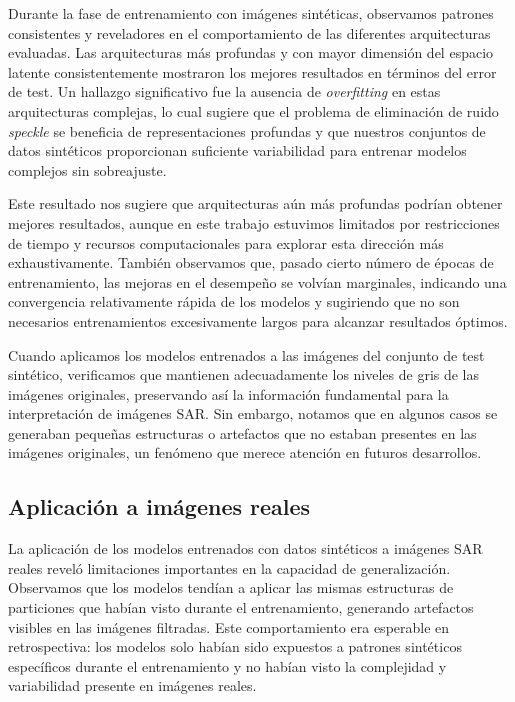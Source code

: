 Durante la fase de entrenamiento con imágenes sintéticas, observamos patrones consistentes y reveladores en el comportamiento de las diferentes arquitecturas evaluadas. Las arquitecturas más profundas y con mayor dimensión del espacio latente consistentemente mostraron los mejores resultados en términos del error de test. Un hallazgo significativo fue la ausencia de \emph{overfitting} en estas arquitecturas complejas, lo cual sugiere que el problema de eliminación de ruido \emph{speckle} se beneficia de representaciones profundas y que nuestros conjuntos de datos sintéticos proporcionan suficiente variabilidad para entrenar modelos complejos sin sobreajuste.

Este resultado nos sugiere que arquitecturas aún más profundas podrían obtener mejores resultados, aunque en este trabajo estuvimos limitados por restricciones de tiempo y recursos computacionales para explorar esta dirección más exhaustivamente. También observamos que, pasado cierto número de épocas de entrenamiento, las mejoras en el desempeño se volvían marginales, indicando una convergencia relativamente rápida de los modelos y sugiriendo que no son necesarios entrenamientos excesivamente largos para alcanzar resultados óptimos.

Cuando aplicamos los modelos entrenados a las imágenes del conjunto de test sintético, verificamos que mantienen adecuadamente los niveles de gris de las imágenes originales, preservando así la información fundamental para la interpretación de imágenes SAR. Sin embargo, notamos que en algunos casos se generaban pequeñas estructuras o artefactos que no estaban presentes en las imágenes originales, un fenómeno que merece atención en futuros desarrollos.

\subsection{Aplicación a imágenes reales}

La aplicación de los modelos entrenados con datos sintéticos a imágenes SAR reales reveló limitaciones importantes en la capacidad de generalización. Observamos que los modelos tendían a aplicar las mismas estructuras de particiones que habían visto durante el entrenamiento, generando artefactos visibles en las imágenes filtradas. Este comportamiento era esperable en retrospectiva: los modelos solo habían sido expuestos a patrones sintéticos específicos durante el entrenamiento y no habían visto la complejidad y variabilidad presente en imágenes reales.

